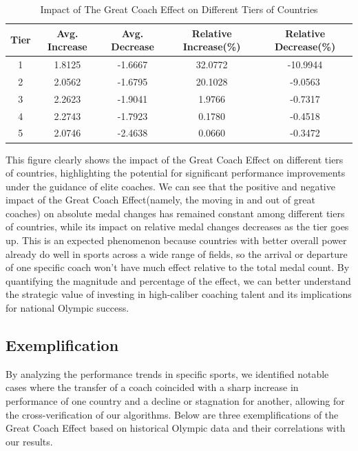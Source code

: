 \documentclass{mcmthesis}
\begin{document}
\begin{table}[htbp]
    \centering
    \begin{tabular}{|c|c|c|c|c|}
        \hline
        Tier & Avg. Increase & Avg. Decrease & Relative Increase(\%) & Relative Decrease(\%) \\
        \hline
        1 & 1.8125 & -1.6667 & 32.0772 & -10.9944 \\
        \hline
        2 & 2.0562 & -1.6795 & 20.1028 & -9.0563 \\
        \hline
        3 & 2.2623 & -1.9041 & 1.9766 & -0.7317 \\
        \hline
        4 & 2.2743 & -1.7923 & 0.1780 & -0.4518 \\
        \hline
        5 & 2.0746 & -2.4638 & 0.0660 & -0.3472 \\
        \hline
    \end{tabular}
    \caption{Impact of The Great Coach Effect on Different Tiers of Countries}
\end{table}

This figure clearly shows the impact of the Great Coach Effect on different tiers of countries, highlighting the potential for significant performance improvements under the guidance of elite coaches. We can see that the positive and negative impact of the Great Coach Effect(namely, the moving in and out of great coaches) on absolute medal changes has remained constant among different tiers of countries, while its impact on relative medal changes decreases as the tier goes up. This is an expected phenomenon because countries with better overall power already do well in sports across a wide range of fields, so the arrival or departure of one specific coach won't have much effect relative to the total medal count. By quantifying the magnitude and percentage of the effect, we can better understand the strategic value of investing in high-caliber coaching talent and its implications for national Olympic success.


\subsection{Exemplification}
By analyzing the performance trends in specific sports, we identified notable cases where the transfer of a coach coincided with a sharp increase in performance of one country and a decline or stagnation for another, allowing for the cross-verification of our algorithms. Below are three exemplifications of the Great Coach Effect based on historical Olympic data and their correlations with our results.\
\end{document}
